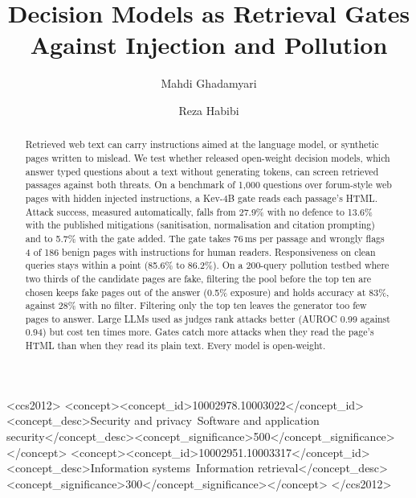 \documentclass[sigconf,nonacm]{acmart}
\begin{document}
\title{Decision Models as Retrieval Gates Against Injection and Pollution}

\author{Mahdi Ghadamyari}
\author{Reza Habibi}

\begin{abstract}
Retrieved web text can carry instructions aimed at the language model, or synthetic pages written to mislead. We test whether released open-weight decision models, which answer typed questions about a text without generating tokens, can screen retrieved passages against both threats. On a benchmark of 1,000 questions over forum-style web pages with hidden injected instructions, a Kev-4B gate reads each passage's HTML. Attack success, measured automatically, falls from 27.9\% with no defence to 13.6\% with the published mitigations (sanitisation, normalisation and citation prompting) and to 5.7\% with the gate added. The gate takes 76\,ms per passage and wrongly flags 4 of 186 benign pages with instructions for human readers. Responsiveness on clean queries stays within a point (85.6\% to 86.2\%). On a 200-query pollution testbed where two thirds of the candidate pages are fake, filtering the pool before the top ten are chosen keeps fake pages out of the answer (0.5\% exposure) and holds accuracy at 83\%, against 28\% with no filter. Filtering only the top ten leaves the generator too few pages to answer. Large LLMs used as judges rank attacks better (AUROC 0.99 against 0.94) but cost ten times more. Gates catch more attacks when they read the page's HTML than when they read its plain text. Every model is open-weight.
\end{abstract}

\begin{CCSXML}
<ccs2012>
<concept><concept_id>10002978.10003022</concept_id><concept_desc>Security and privacy~Software and application security</concept_desc><concept_significance>500</concept_significance></concept>
<concept><concept_id>10002951.10003317</concept_id><concept_desc>Information systems~Information retrieval</concept_desc><concept_significance>300</concept_significance></concept>
</ccs2012>
\end{CCSXML}
\end{document}

